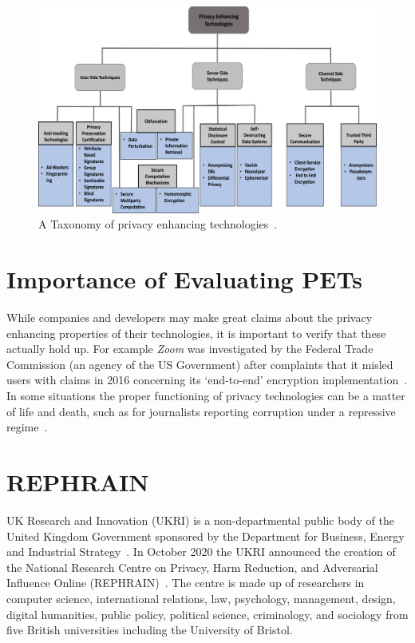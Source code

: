 \documentclass[
    author={Jacob Daniel Halsey},
    supervisor={Prof. Awais Rashid},
    degree={BSc},
    title={Building a Testbed for Evaluating Privacy Enhancing Technologies  (PETs)},
    subtitle={},
    type={software development},
    year={2021}
]{dissertation}
\begin{document}
\begin{figure}
	\centering
	\includegraphics{img/pet_taxonomy}
	\caption{A Taxonomy of privacy enhancing technologies~\cite{kaaniche_2020_privacy}.}
	\label{pet_taxonomy}
\end{figure}

\section{Importance of Evaluating PETs}

While companies and developers may make great claims about the privacy enhancing properties
of their technologies, it is important to verify that these actually hold up.
For example \emph{Zoom} was investigated by the Federal Trade Commission (an agency of the US Government)
after complaints that it misled users with claims in 2016 concerning 
its `end-to-end' encryption implementation~\cite{zoom}.
In some situations the proper functioning of privacy technologies can be a matter of life and
death, such as for journalists reporting corruption under a repressive regime~\cite{transparency}.

\section{REPHRAIN}
\label{sect:rephrain}

UK Research and Innovation (UKRI) is a non-departmental public body of the United Kingdom Government
sponsored by the Department for Business, Energy and Industrial Strategy~\cite{ukri_who_we_are}.
In October 2020 the UKRI announced the creation of the National Research Centre on Privacy, Harm Reduction,
and Adversarial Influence Online (REPHRAIN)~\cite{ukri_new_centre}.
The centre is made up of researchers in computer science, international relations, law, psychology, management,
design, digital humanities, public policy, political science, criminology, and sociology from five British
universities including the University of Bristol. \\
\end{document}
